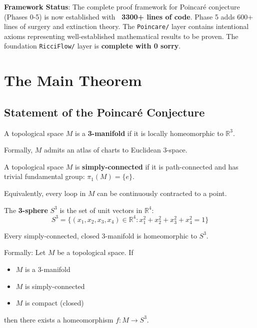 \textbf{Framework Status}: The complete proof framework for Poincaré conjecture (Phases 0-5) is now established with \textbf{~3300+ lines of code}. Phase 5 adds 600+ lines of surgery and extinction theory. The \texttt{Poincare/} layer contains intentional axioms representing well-established mathematical results to be proven. The foundation \texttt{RicciFlow/} layer is \textbf{complete with 0 sorry}.

\chapter{The Main Theorem}
\label{chap:main_theorem}

\section{Statement of the Poincaré Conjecture}

\begin{definition}[3-Manifold]
\label{def:3manifold}
A topological space $M$ is a \textbf{3-manifold} if it is locally homeomorphic to $\mathbb{R}^3$.

Formally, $M$ admits an atlas of charts to Euclidean 3-space.
\end{definition}

\begin{definition}
\label{def:simply_connected}
A topological space $M$ is \textbf{simply-connected} if it is path-connected and has trivial fundamental group: $\pi_1(M) = \{e\}$.

Equivalently, every loop in $M$ can be continuously contracted to a point.
\end{definition}

\begin{definition}[3-Sphere]
\label{def:sphere3}
The \textbf{3-sphere} $S^3$ is the set of unit vectors in $\mathbb{R}^4$:
\[
S^3 = \{(x_1, x_2, x_3, x_4) \in \mathbb{R}^4 : x_1^2 + x_2^2 + x_3^2 + x_4^2 = 1\}
\]
\end{definition}

\begin{theorem}
\label{thm:poincare_conjecture}
\leanok
Every simply-connected, closed 3-manifold is homeomorphic to $S^3$.

Formally: Let $M$ be a topological space. If
\begin{itemize}
\item $M$ is a 3-manifold
\item $M$ is simply-connected
\item $M$ is compact (closed)
\end{itemize}
then there exists a homeomorphism $f : M \to S^3$.
\end{theorem}

